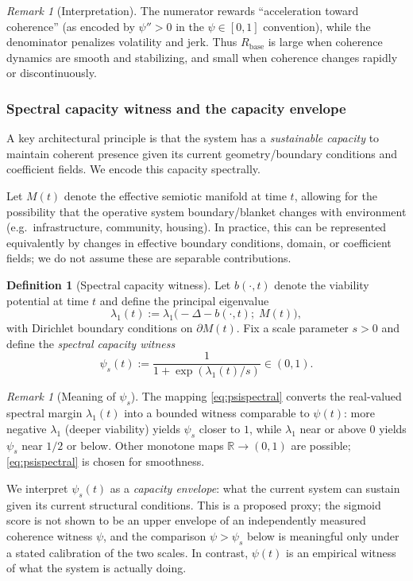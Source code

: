 \documentclass[11pt]{article}
\theoremstyle{plain}
\theoremstyle{definition}
\newtheorem{definition}[theorem]{Definition}
\theoremstyle{remark}
\newtheorem{remark}[theorem]{Remark}
\begin{document}
\begin{remark}[Interpretation]
The numerator rewards ``acceleration toward coherence'' (as encoded by $\psi''>0$ in the $\psi\in[0,1]$ convention), while the denominator penalizes volatility and jerk. Thus $R_{\mathrm{base}}$ is large when coherence dynamics are smooth and stabilizing, and small when coherence changes rapidly or discontinuously.
\end{remark}

\subsubsection*{Spectral capacity witness and the capacity envelope}
A key architectural principle is that the system has a \emph{sustainable capacity} to maintain coherent presence given its current geometry/boundary conditions and coefficient fields. We encode this capacity spectrally.

Let $M(t)$ denote the effective semiotic manifold at time $t$, allowing for the possibility that the operative system boundary/blanket changes with environment (e.g.\ infrastructure, community, housing). In practice, this can be represented equivalently by changes in effective boundary conditions, domain, or coefficient fields; we do not assume these are separable contributions.

\begin{definition}[Spectral capacity witness]\label{def:psispectral}
Let $b(\cdot,t)$ denote the viability potential at time $t$ and define the principal eigenvalue
\[
\lambda_1(t):=\lambda_1\!\big(-\Delta - b(\cdot,t);\; M(t)\big),
\]
with Dirichlet boundary conditions on $\partial M(t)$.
Fix a scale parameter $s>0$ and define the \emph{spectral capacity witness}
\begin{equation}\label{eq:psispectral}
\psi_s(t):=\frac{1}{1+\exp(\lambda_1(t)/s)}\in(0,1).
\end{equation}
\end{definition}

\begin{remark}[Meaning of $\psi_s$]
The mapping \eqref{eq:psispectral} converts the real-valued spectral margin $\lambda_1(t)$ into a bounded witness comparable to $\psi(t)$:
more negative $\lambda_1$ (deeper viability) yields $\psi_s$ closer to $1$, while $\lambda_1$ near or above $0$ yields $\psi_s$ near $1/2$ or below.
Other monotone maps $\mathbb{R}\to(0,1)$ are possible; \eqref{eq:psispectral} is chosen for smoothness.

We interpret $\psi_s(t)$ as a \emph{capacity envelope}: what the current system can sustain given its current structural conditions. This is a proposed proxy; the sigmoid score is not shown to be an upper envelope of an independently measured coherence witness $\psi$, and the comparison $\psi>\psi_s$ below is meaningful only under a stated calibration of the two scales. In contrast, $\psi(t)$ is an empirical witness of what the system is actually doing.
\end{remark}
\end{document}
